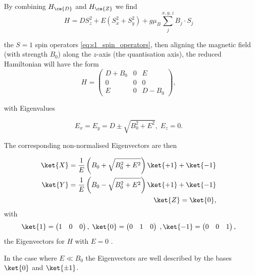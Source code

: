 By combining $H_{\ce{D}}$ and $H_{\ce{Z}}$
we find
\begin{equation}
	H_{} = D S_z^2 + E(S_x^2 + S_y^2) + g \mu_B \sum_{j}^{x,y,z} B_j \cdot S_j
	\label{eq:reduced_H_NV}
\end{equation}

the $S=1$ spin operators \eqref{eq:s1_spin_operators}, then aligning the magnetic field (with strength $B_0$) along the $z$-axis (the quantisation axis), the reduced Hamiltonian will have the form
\begin{equation}
	H_{} = \begin{pmatrix}
		D + B_0 & 0 & E     \\
		0       & 0 & 0     \\
		E       & 0 & D-B_0
	\end{pmatrix},
	\label{eq:reduced_H_NV_matrix}
\end{equation}

with Eigenvalues

\begin{equation}
	E_x = E_y = D \pm \sqrt{B_0^2  + E^2}, \; E_z = 0.
	\label{eq:reduced_H_NV_eigenvalues}
\end{equation}

The corresponding non-normalised Eigenvectors are then

\begin{eqnarray}
	\ket{X} = \frac{1}{E} \left(B_0 + \sqrt{B_0^2 + E^2}\right) \ket{+1} + \ket{-1} \\
	\ket{Y} = \frac{1}{E} \left(B_0 - \sqrt{B_0^2 + E^2}\right) \ket{+1} + \ket{-1} \\
	\ket{Z} = \ket{0},
\end{eqnarray}
with
\begin{equation}
	\ket{1} = \begin{pmatrix}
		1 & 0 & 0
	\end{pmatrix}, \;
	\ket{0} = \begin{pmatrix}
		0 & 1 & 0
	\end{pmatrix}\;,
	\ket{-1} = \begin{pmatrix}
		0 & 0 & 1
	\end{pmatrix},
	\label{eq:base_states}
\end{equation}
the Eigenvectors for $H$ with $E=0$ .

In the case where $E \ll B_0$ the Eigenvectors are well described by the bases $\ket{0}$ and $\ket{\pm 1}$.


